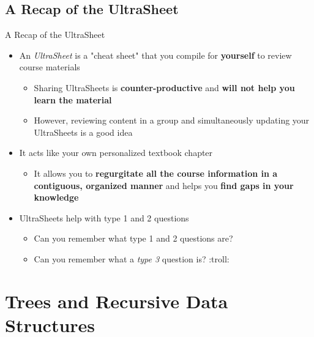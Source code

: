 \documentclass[hyperref={colorlinks,citecolor=blue,linkcolor=blue,urlcolor=blue}, aspectratio=1610]{beamer}
\begin{document}
\subsection{A Recap of the UltraSheet\texttrademark{}}
\begin{frame}{A Recap of the UltraSheet\texttrademark{}}
  \begin{itemize}
    \item An \textit{UltraSheet\texttrademark{}} is a "cheat sheet" that you compile for \textbf{yourself} to review course materials 
    \begin{itemize}
      \item Sharing UltraSheets\texttrademark{} is \textbf{counter-productive} and \textbf{will not help you learn the material}
      \item However, reviewing content in a group and simultaneously updating your UltraSheets\texttrademark{} is a good idea
    \end{itemize}
    \item It acts like your own personalized textbook chapter
    \begin{itemize}
      \item It allows you to \textbf{regurgitate all the course information in a contiguous, organized manner} and helps you \textbf{find gaps in your knowledge}
    \end{itemize}
    \item UltraSheets\texttrademark{} help with type 1 and 2 questions 
    \begin{itemize}
      \item Can you remember what type 1 and 2 questions are?
      \item Can you remember what a \textit{type 3} question is? :troll:
    \end{itemize}
  \end{itemize}

\end{frame}

\section{Trees and Recursive Data Structures}
\end{document}
